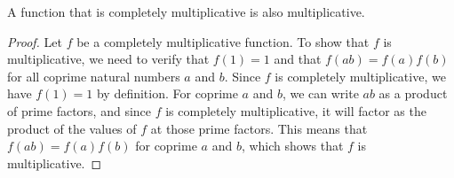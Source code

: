 \begin{theorem}
\label{IsCompletelyMultiplicative.isMultiplicative}
\leanok
A function that is completely multiplicative is also multiplicative.
\end{theorem}
\begin{proof}
\leanok
Let $f$ be a completely multiplicative function. To show that $f$ is multiplicative, we need to verify that $f(1) = 1$ and that $f(ab) = f(a)f(b)$ for all coprime natural numbers $a$ and $b$. Since $f$ is completely multiplicative, we have $f(1) = 1$ by definition. For coprime $a$ and $b$, we can write $ab$ as a product of prime factors, and since $f$ is completely multiplicative, it will factor as the product of the values of $f$ at those prime factors. This means that $f(ab) = f(a)f(b)$ for coprime $a$ and $b$, which shows that $f$ is multiplicative.
\end{proof}
